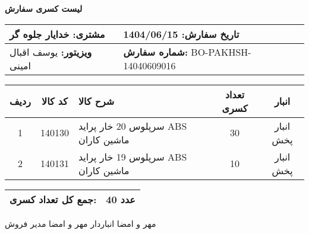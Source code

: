 \documentclass[a4paper,12pt]{article}
\begin{document}
\begin{center}
    {\Huge \textbf{   لیست کسری سفارش   }} \\
\end{center}

\vspace{0.5cm}

\noindent
\begin{tabular}{|p{7cm}|p{7cm}|}
\hline
\textbf{مشتری:} خدایار جلوه گر & \textbf{تاریخ سفارش:} 1404/06/15 \\
\hline
\textbf{ویزیتور:} یوسف اقبال امینی & \textbf{شماره سفارش:} BO-PAKHSH-14040609016 \\
\hline
\end{tabular}

\vspace{0.5cm}

\begin{longtable}{|c|c|p{6cm}|c|c|}
\hline
\rowcolor{headerblue} \color{white}
\textbf{ردیف} &  \textbf{کد کالا} & \textbf{شرح کالا} & \textbf{تعداد کسری} & \textbf{انبار} \\
\hline
\endhead
1 & 140130 & سرپلوس 20 خار پرايد ABS ماشين کاران & 30 & انبار پخش \\
\hline
2 & 140131 & سرپلوس 19 خار پرايد ABS ماشين کاران & 10 & انبار پخش \\
\hline

\end{longtable}

\vspace{0.3cm}
\noindent
\begin{tabular}{|p{7cm}|p{7cm}|}
\hline
\textbf{جمع کل تعداد کسری:} & 40 عدد \\
\hline
\end{tabular}

\vspace{1.5cm}

\noindent
مهر و امضا انباردار \hspace{8cm} مهر و امضا مدیر فروش
\end{document}
